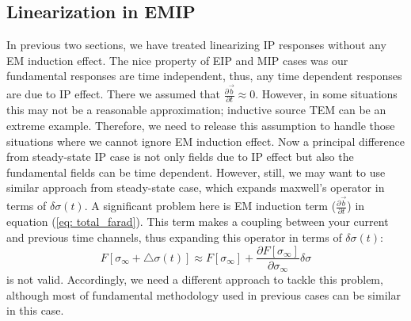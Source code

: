 \documentclass[a4paper, 11pt]{article}
\newcommand{\siginf}{\sigma_\infty}
\newcommand{\dsig}{\triangle\sigma}
\renewcommand {\b}  { {\vec b} }
\newcommand{\sigpert}{\delta\sigma}
\begin{document}
\subsection{Linearization in EMIP}
In previous two sections, we have treated linearizing IP responses without any EM induction effect. The nice property of EIP and MIP cases was our fundamental responses are time independent, thus, any time dependent responses are due to IP effect. There we assumed that $\frac{\partial \b}{\partial t}\approx 0$. However, in some situations this may not be a reasonable approximation; inductive source TEM can be an extreme example. Therefore, we need to release this assumption to handle those situations where we cannot ignore EM induction effect. Now a principal difference from steady-state IP case is not only fields due to IP effect but also the fundamental fields can be time dependent. However, still, we may want to use similar approach from steady-state case, which expands maxwell's operator in terms of $\sigpert(t)$. A significant problem here is EM induction term ($\frac{\partial \b}{\partial t}$) in equation (\ref{eq: total_farad}). This term makes a coupling between your current and previous time channels, thus expanding this operator in terms of $\sigpert(t)$:
\begin{equation*}
  F[\siginf+\dsig(t)] \approx F[\siginf] + \frac{\partial F[\siginf]}{\partial \siginf}\sigpert
\end{equation*}
is not valid. Accordingly, we need a different approach to tackle this problem, although most of fundamental methodology used in previous cases can be similar in this case.
\end{document}
